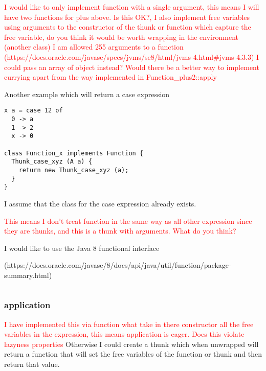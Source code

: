 \documentclass[12pt,a4paper,twoside]{article}
\begin{document}
\textcolor{red}{I would like to only implement function with a single argument, this means I will have two functions for plus above. Is this OK?,
I also implement free variables using arguments to the constructor of the thunk or function which capture the free variable, do you think it would
be worth wrapping in the environment (another class) I am allowed 255 arguments to a function \\(https://docs.oracle.com/javase/specs/jvms/se8/html/jvms-4.html\#jvms-4.3.3)
I could pass an array of object instead? Would there be a better way to implement currying apart from the way implemented in Function\_plus2::apply}

Another example which will return a case expression

\begin{verbatim}
x a = case 12 of
  0 -> a
  1 -> 2
  x -> 0

class Function_x implements Function {
  Thunk_case_xyz (A a) {
    return new Thunk_case_xyz (a); 
  }
}
\end{verbatim}

I assume that the class for the case expression already exists.

\textcolor{red}{This means I don't treat function in the same way as all other expression since they are thunks, and this is a thunk with arguments.
 What do you think?}

I would like to use the Java 8 functional interface 

(https://docs.oracle.com/javase/8/docs/api/java/util/function/package-summary.html)



\begin{verbatim}

\end{verbatim}

\subsubsection{application}

\textcolor{red}{I have implemented this via function what take in there constructor all the free variables in the expression, this means application is eager. Does this
violate lazyness properties}
Otherwise I could create a thunk which when unwrapped will return a function that will set the free variables of the function or thunk and then return that value.
\end{document}
